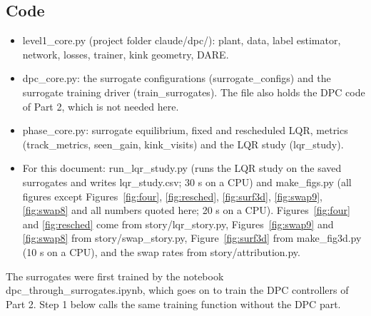 \documentclass[11pt]{article}
\begin{document}
\subsection{Code}
\begin{itemize}
\item level1\_core.py (project folder claude/dpc/): plant, data, label estimator, network, losses, trainer, kink geometry, DARE.
\item dpc\_core.py: the surrogate configurations (surrogate\_configs) and the surrogate training driver (train\_surrogates). The file also holds the DPC code of Part 2, which is not needed here.
\item phase\_core.py: surrogate equilibrium, fixed and rescheduled LQR, metrics (track\_metrics, seen\_gain, kink\_visits) and the LQR study (lqr\_study).
\item For this document: run\_lqr\_study.py (runs the LQR study on the saved surrogates and writes lqr\_study.csv; 30 s on a CPU) and make\_figs.py (all figures except Figures~\ref{fig:four}, \ref{fig:resched}, \ref{fig:surf3d}, \ref{fig:swap9}, \ref{fig:swap8} and all numbers quoted here; 20 s on a CPU). Figures~\ref{fig:four} and \ref{fig:resched} come from story/lqr\_story.py, Figures~\ref{fig:swap9} and \ref{fig:swap8} from story/swap\_story.py, Figure~\ref{fig:surf3d} from make\_fig3d.py (10 s on a CPU), and the swap rates from story/attribution.py.
\end{itemize}
The surrogates were first trained by the notebook dpc\_through\_surrogates.ipynb, which goes on to train the DPC controllers of Part 2. Step 1 below calls the same training function without the DPC part.
\end{document}
